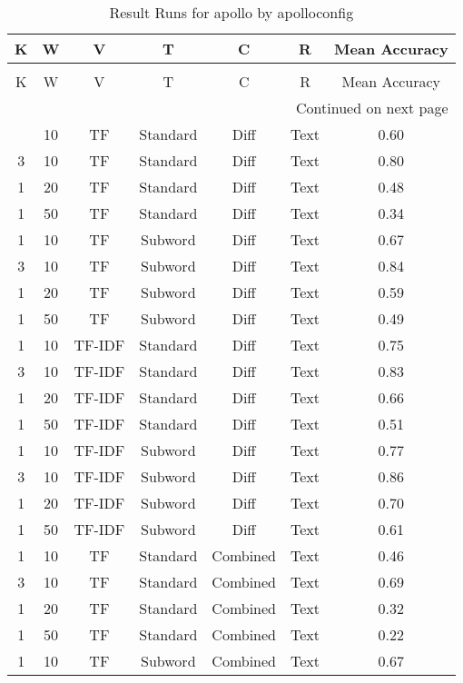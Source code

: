 \begin{longtable}{|c|c|c|c|c|c|c|}
\hline
K & W & V & T & C & R & Mean Accuracy \\
\hline
\endfirsthead
\caption[]{Continued from previous page} \\
\hline
K & W & V & T & C & R & Mean Accuracy \\
\hline
\endhead
\hline
\multicolumn{7}{r}{Continued on next page} \\
\endfoot
\hline
\caption{Result Runs for apollo by apolloconfig} 
\label{result-runs-apollo-apolloconfig}
\endlastfoot
1 & 10 & TF & Standard & Diff & Text & 0.60 \\
\hline
3 & 10 & TF & Standard & Diff & Text & 0.80 \\
\hline
1 & 20 & TF & Standard & Diff & Text & 0.48 \\
\hline
1 & 50 & TF & Standard & Diff & Text & 0.34 \\
\hline
1 & 10 & TF & Subword & Diff & Text & 0.67 \\
\hline
3 & 10 & TF & Subword & Diff & Text & 0.84 \\
\hline
1 & 20 & TF & Subword & Diff & Text & 0.59 \\
\hline
1 & 50 & TF & Subword & Diff & Text & 0.49 \\
\hline
1 & 10 & TF-IDF & Standard & Diff & Text & 0.75 \\
\hline
3 & 10 & TF-IDF & Standard & Diff & Text & 0.83 \\
\hline
1 & 20 & TF-IDF & Standard & Diff & Text & 0.66 \\
\hline
1 & 50 & TF-IDF & Standard & Diff & Text & 0.51 \\
\hline
1 & 10 & TF-IDF & Subword & Diff & Text & 0.77 \\
\hline
3 & 10 & TF-IDF & Subword & Diff & Text & 0.86 \\
\hline
1 & 20 & TF-IDF & Subword & Diff & Text & 0.70 \\
\hline
1 & 50 & TF-IDF & Subword & Diff & Text & 0.61 \\
\hline
1 & 10 & TF & Standard & Combined & Text & 0.46 \\
\hline
3 & 10 & TF & Standard & Combined & Text & 0.69 \\
\hline
1 & 20 & TF & Standard & Combined & Text & 0.32 \\
\hline
1 & 50 & TF & Standard & Combined & Text & 0.22 \\
\hline
1 & 10 & TF & Subword & Combined & Text & 0.67 \\
\hline

\end{longtable}
